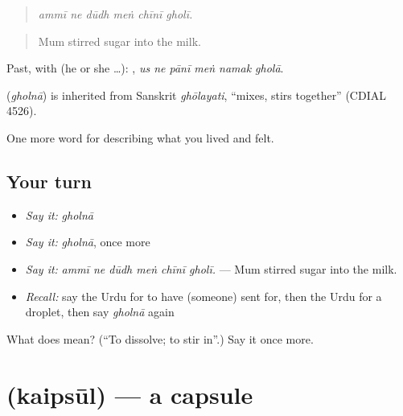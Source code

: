 \begin{quote}
\emph{ammī ne dūdh meṅ chīnī gholī.}
\end{quote}

\begin{quote}
Mum stirred sugar into the milk.
\end{quote}

Past, with  (he or she …):      , \emph{us ne pānī meṅ namak gholā}.

\begin{cousinweb}
\textbf{} (\emph{gholnā}) is inherited from Sanskrit \emph{ghōlayati}, \textquotedblleft{}mixes, stirs together\textquotedblright{} (CDIAL 4526).
\end{cousinweb}

\begin{grammarlens}[title={What you've built}]
One more word for describing what you lived and felt.
\end{grammarlens}

\subsection*{Your turn}
\begin{itemize}
\raggedright
  \item \emph{Say it:} \emph{gholnā}
  \item \emph{Say it:} \emph{gholnā}, once more
  \item \emph{Say it:} \emph{ammī ne dūdh meṅ chīnī gholī.} — Mum stirred sugar into the milk.
  \item \emph{Recall:} say the Urdu for to have (someone) sent for, then the Urdu for a droplet, then say \emph{gholnā} again
\end{itemize}

\begin{tcolorbox}[breakable,colback=teal!4,colframe=teal!35!black,title={Before you move on}]
What does  mean? (\textquotedblleft{}To dissolve; to stir in\textquotedblright{}.) Say it once more.
\end{tcolorbox}
\section[\texorpdfstring{\ur{کیپسول} (kaipsūl)}{کیپسول (kaipsūl)}]{ (kaipsūl) — a capsule}

\label{lesson:UR-C477-kaipsul}



